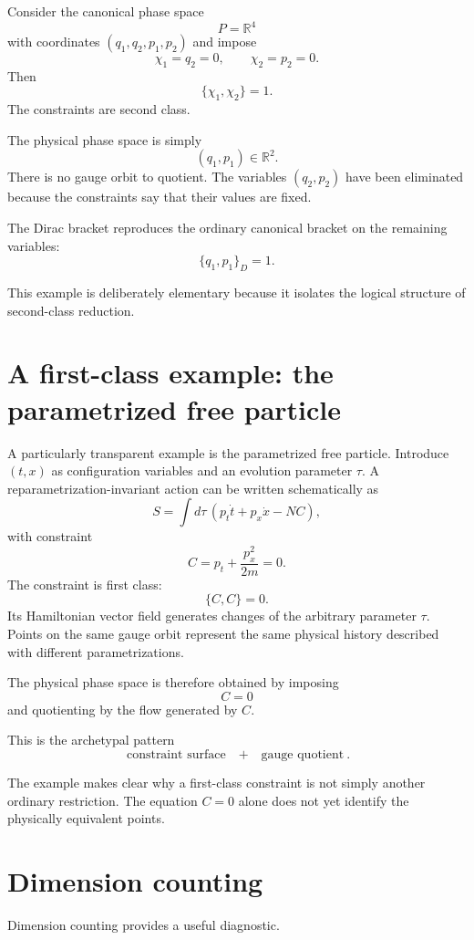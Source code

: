Consider the canonical phase space
\[
        P=\mathbb{R}^4
\]
with coordinates $(q_1,q_2,p_1,p_2)$ and impose
\[
        \chi_1=q_2=0,
        \qquad
        \chi_2=p_2=0.
\]
Then
\[
        \{\chi_1,\chi_2\}=1.
\]
The constraints are second class.

The physical phase space is simply
\[
        (q_1,p_1)\in\mathbb{R}^2.
\]
There is no gauge orbit to quotient.  The variables $(q_2,p_2)$ have been
eliminated because the constraints say that their values are fixed.

The Dirac bracket reproduces the ordinary canonical bracket on the remaining
variables:
\[
        \{q_1,p_1\}_D=1.
\]

This example is deliberately elementary because it isolates the logical
structure of second-class reduction.

\section{A first-class example: the parametrized free particle}

A particularly transparent example is the parametrized free particle.
Introduce $(t,x)$ as configuration variables and an evolution parameter
$\tau$.  A reparametrization-invariant action can be written schematically as
\[
        S=\int d\tau\,
        \left(
        p_t\dot t+p_x\dot x
        -N C
        \right),
\]
with constraint
\[
        C=p_t+\frac{p_x^2}{2m}=0.
\]
The constraint is first class:
\[
        \{C,C\}=0.
\]
Its Hamiltonian vector field generates changes of the arbitrary parameter
$\tau$.  Points on the same gauge orbit represent the same physical history
described with different parametrizations.

The physical phase space is therefore obtained by imposing
\[
        C=0
\]
and quotienting by the flow generated by $C$.

This is the archetypal pattern
\[
        \boxed{
        \text{constraint surface}
        \quad+\quad
        \text{gauge quotient}
        }.
\]

The example makes clear why a first-class constraint is not simply another
ordinary restriction.  The equation $C=0$ alone does not yet identify the
physically equivalent points.

\section{Dimension counting}

Dimension counting provides a useful diagnostic.

